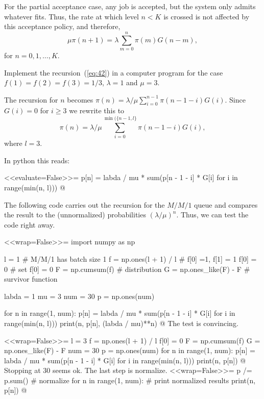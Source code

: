 \begin{question}
\begin{solution}
  For the partial acceptance case, any job is accepted, but the system
  only admits whatever fits. Thus, the rate at which level $n<K$ is
  crossed is not affected by this acceptance policy, and therefore,
  \begin{equation*}
    \mu \pi(n+1) = \lambda \sum_{m=0}^n \pi(m) G(n-m), 
  \end{equation*}
  for $n=0,1,\ldots, K$. 
\end{solution}
\end{question}



\begin{question}
  Implement the recursion~(\ref{eq:42}) in a computer program for the
  case $f(1)=f(2)=f(3)=1/3$, $\lambda =1$ and $\mu = 3$.  
  \begin{solution}
The recursion for $n$ becomes $\pi(n) = \lambda/\mu \sum_{i=0}^{n-1} \pi(n-1-i)G(i)$. Since $G(i) =0$ for $i\geq 3$ we rewrite this to 
\begin{equation*}
  \pi(n) = \lambda/\mu \sum_{i=0}^{\min(\{n-1,l\}} \pi(n-1-i)G(i),
\end{equation*}
where $l=3$. 

In python this reads:

<<evaluate=False>>=
p[n] = labda / mu * sum(p[n - 1 - i] * G[i] for i in range(min(n, l)))
@

The following code carries out the recursion for the $M/M/1$ queue and compares the result to the (unnormalized) probabilities $(\lambda/\mu)^n$. Thus, we can test the code right away. 

<<wrap=False>>=
import numpy as np

l = 1 # M/M/1 has batch size 1
f = np.ones(l + 1) / l # f[0] =1, f[1] = 1 
f[0] = 0 # set f[0] = 0
F = np.cumsum(f) # distribution 
G = np.ones_like(F) - F # survivor function

labda = 1
mu = 3
num = 30
p = np.ones(num)

for n in range(1, num):
    p[n] = labda / mu * sum(p[n - 1 - i] * G[i] for i in range(min(n, l)))
    print(n, p[n], (labda / mu)**n)
@
The test is convincing.

<<wrap=False>>=
l = 3
f = np.ones(l + 1) / l
f[0] = 0
F = np.cumsum(f)
G = np.ones_like(F) - F
num = 30
p = np.ones(num)
for n in range(1, num):
    p[n] = labda / mu * sum(p[n - 1 - i] * G[i] for i in range(min(n, l)))
    print(n, p[n])
@
Stopping at 30 seems ok. The last step is normalize.
<<wrap=False>>=
p /= p.sum()  # normalize
for n in range(1, num):  # print normalized results
    print(n, p[n])
@


\end{solution}
\end{question}
